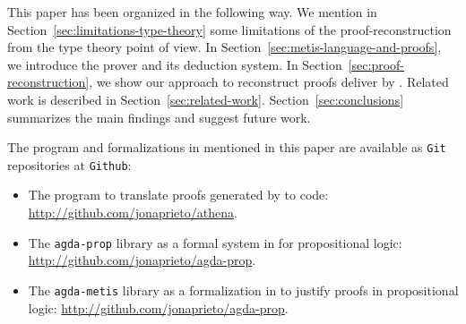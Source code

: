 \documentclass[../main.tex]{subfiles}
\begin{document}
This paper has been organized in the following way.
We mention in Section~\ref{sec:limitations-type-theory}
some limitations of the proof-reconstruction from the type theory
point of view. In Section~\ref{sec:metis-language-and-proofs}, we introduce the
\Metis prover and its deduction system.
In Section~\ref{sec:proof-reconstruction}, we show our
approach to reconstruct proofs deliver by \Metis.
Related work is described in Section~\ref{sec:related-work}.
Section~\ref{sec:conclusions} summarizes the main findings and suggest future work.


The program and formalizations in \Agda mentioned in this paper are available
as \verb!Git! repositories at \verb!Github!:

\begin{itemize}
  \item The \Athena program to translate proofs generated by \Metis to \Agda code:
  \url{http://github.com/jonaprieto/athena}.
  \item The \verb!agda-prop! library as a formal system in \Agda for propositional logic:
  \url{http://github.com/jonaprieto/agda-prop}.
  \item The \verb!agda-metis! library as a formalization in \Agda to justify \Metis proofs in propositional
  logic:
  \url{http://github.com/jonaprieto/agda-prop}.
\end{itemize}
\end{document}
